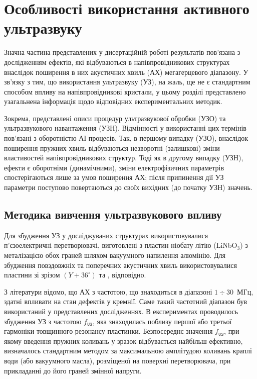 \chapter{Особливості використання активного ультразвуку}
Значна частина представлених у дисертаційній роботі результатів пов'язана з дослідженням ефектів, які відбуваються в напівпровідникових структурах внаслідок
поширення в них акустичних хвиль (АХ) мегагерцевого діапазону.
У зв'язку з тим, що використання ультразвуку (УЗ), на жаль, ще не є стандартним способом впливу на напівпровідникові кристали,
у цьому розділі представлено узагальнена  інформація щодо відповідних експериментальних методик.

Зокрема, представлені описи процедур ультразвукової обробки (УЗО) та ультразвукового навантаження (УЗН).
Відмінності у використанні цих термінів пов'язані з оборотністю АІ процесів.
Так, в першому випадку (УЗО), внаслідок поширення пружних хвиль відбуваються незворотні (залишкові) зміни властивостей напівпровідникових структур.
Тоді як в другому випадку (УЗН), ефекти є оборотніми (динамічними), зміни електрофізичних параметрів спостерігаються лише за умов поширення АХ;
після припинення дії УЗ параметри поступово повертаються до своїх вихідних (до початку УЗН) значень.



\section{Методика вивчення ультразвукового впливу}
%
Для збудження УЗ у досліджуваних структурах використовувалися п'єзоелектричні перетворювачі,
виготовлені з пластин ніобату літію (LiNbO$_3$) з металізацією обох граней шляхом вакуумного напилення алюмінію.
Для збудження повздовжніх та поперечних акустичних хвиль використовувалися пластини зі зрізом $(Y\!+\!36^\circ)$ та , відповідно.

З літератури \cite{Ostapenko1995,Davletova2008,Davletova2009,Pashaev2014r} відомо, що АХ з частотою, що знаходиться в діапазоні $1\div30$~МГц, здатні впливати на стан дефектів у кремнії.
Саме такий частотний діапазон був використаний у представлених дослідженнях.
В експериментах проводилось збудження УЗ з частотою $f_\mathtt{US}$, яка знаходилась поблизу першої або третьої гармоніки товщинного резонансу пластинки.
Безпосереднє значення $f_\mathtt{US}$, при якому введення пружних коливань у зразок відбувається найбільш ефективно, визначалось стандартним методом за максимальною амплітудою коливань краплі води (або вакуумного масла), розміщеної на поверхні перетворювача, при прикладанні до його граней змінної напруги.

